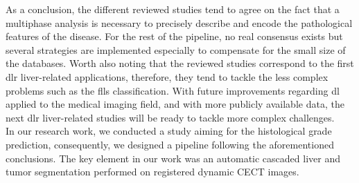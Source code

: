 As a conclusion, the different reviewed studies tend to agree on the
fact that a multiphase analysis is necessary to precisely describe and
encode the pathological features of the disease. For the rest of the
pipeline, no real consensus exists but several strategies are
implemented especially to compensate for the small size of the
databases. Worth also noting that the reviewed studies correspond to the
first \ac{dlr} liver-related applications, therefore, they tend to tackle the
less complex problems such as the \ac{fll}s classification. With future
improvements regarding \ac{dl} applied to the medical imaging field, and with
more publicly available data, the next \ac{dlr} liver-related studies will be
ready to tackle more complex challenges.\\
In our research work, we conducted a study aiming for the histological grade prediction, 
consequently, we designed a pipeline following the aforementioned conclusions. 
The key element in our work was an automatic cascaded liver and tumor segmentation performed on registered dynamic CECT images.
